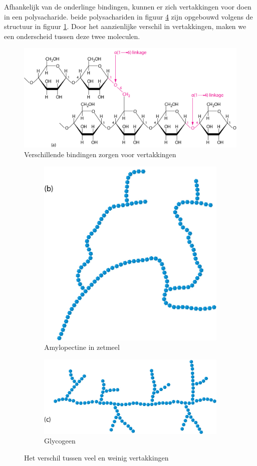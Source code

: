 \documentclass[a4paper,kul]{kulakarticle} %
\begin{document}
Afhankelijk van de onderlinge bindingen, kunnen er zich vertakkingen voor doen in een polysacharide. beide polysachariden in figuur \ref{fig:vertakkingen} zijn opgebouwd volgens de structuur in figuur \ref{fig:vertakking}. Door het aanzienlijke verschil in vertakkingen, maken we een onderscheid tussen deze twee moleculen.
\begin{figure}[h]
	\centering
	\includegraphics[width=0.7\linewidth]{Vertakking}
	\caption[Vertakking]{Verschillende bindingen zorgen voor vertakkingen}
	\label{fig:vertakking}
\end{figure}

\begin{figure}[h]
	\centering
	\begin{subfigure}{.5\textwidth}
		\centering
		\includegraphics[width=.4\linewidth]{amylopectine_in_zetmeel.png}
		\caption{Amylopectine in zetmeel}
		\label{fig:sub1}
	\end{subfigure}%
	\begin{subfigure}{.5\textwidth}
		\centering
		\includegraphics[width=.7\linewidth]{Glycogeen.png}
		\caption{Glycogeen}
		\label{fig:sub2}
	\end{subfigure}
	\caption{Het verschil tussen veel en weinig vertakkingen}
	\label{fig:vertakkingen}
\end{figure}
\newpage
\end{document}
